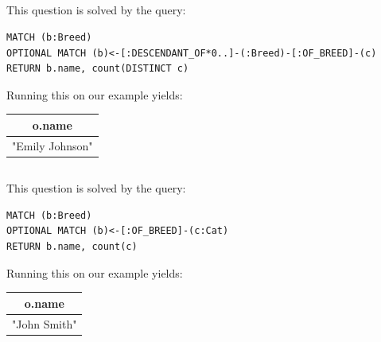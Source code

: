 \documentclass{article}
\begin{document}
\subsection{}
This question is solved by the query:
\begin{lstlisting}
MATCH (b:Breed)
OPTIONAL MATCH (b)<-[:DESCENDANT_OF*0..]-(:Breed)-[:OF_BREED]-(c)
RETURN b.name, count(DISTINCT c)    
\end{lstlisting}

Running this on our example yields:\\
\begin{center}
\begin{tabular}{|c|}
    \hline
    \textbf{o.name} \\
    \hline
    "Emily Johnson" \\
    \hline
\end{tabular}
\end{center}


\subsection{}
This question is solved by the query:
\begin{lstlisting}
MATCH (b:Breed)
OPTIONAL MATCH (b)<-[:OF_BREED]-(c:Cat)
RETURN b.name, count(c)
\end{lstlisting}

Running this on our example yields:\\
\begin{center}
\begin{tabular}{|c|}
    \hline
    \textbf{o.name} \\
    \hline
    "John Smith" \\
    \hline
\end{tabular}
\end{center}
\end{document}
